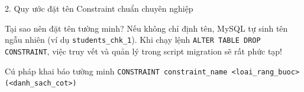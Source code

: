 \documentclass[aspectratio=169,11pt]{beamer}
\newcommand{\smallgap}{\vspace{0.2em}}
\begin{document}
\begin{frame}{2. Quy ước đặt tên Constraint chuẩn chuyên nghiệp}
\begin{alertblock}{Tại sao nên đặt tên tường minh?}
  Nếu không chỉ định tên, MySQL tự sinh tên ngẫu nhiên (ví dụ \texttt{students\_chk\_1}). Khi chạy lệnh \texttt{ALTER TABLE DROP CONSTRAINT}, việc truy vết và quản lý trong script migration sẽ rất phức tạp!
\end{alertblock}

\begin{center}
\end{center}

\smallgap
\begin{exampleblock}{Cú pháp khai báo tường minh}
  \texttt{CONSTRAINT constraint\_name <loai\_rang\_buoc> (<danh\_sach\_cot>)}
\end{exampleblock}
\end{frame}

\end{document}
